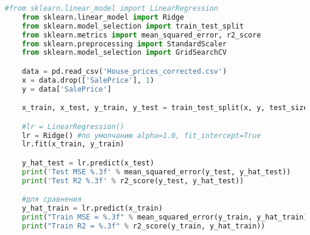 \begin{lstlisting}[language=Python]
	#from sklearn.linear_model import LinearRegression
	from sklearn.linear_model import Ridge
	from sklearn.model_selection import train_test_split
	from sklearn.metrics import mean_squared_error, r2_score
	from sklearn.preprocessing import StandardScaler
	from sklearn.model_selection import GridSearchCV

	data = pd.read_csv('House_prices_corrected.csv')
	x = data.drop(['SalePrice'], 1)
	y = data['SalePrice']

	x_train, x_test, y_train, y_test = train_test_split(x, y, test_size=0.2, random_state=10)

	#lr = LinearRegression()
	lr = Ridge() #по умолчанию alpha=1.0, fit_intercept=True
	lr.fit(x_train, y_train)

	y_hat_test = lr.predict(x_test)
	print('Test MSE %.3f' % mean_squared_error(y_test, y_hat_test))
	print('Test R2 %.3f' % r2_score(y_test, y_hat_test))

	#для сравнения
	y_hat_train = lr.predict(x_train)
	print("Train MSE = %.3f" % mean_squared_error(y_train, y_hat_train))
	print("Train R2 = %.3f" % r2_score(y_train, y_hat_train))
\end{lstlisting}
